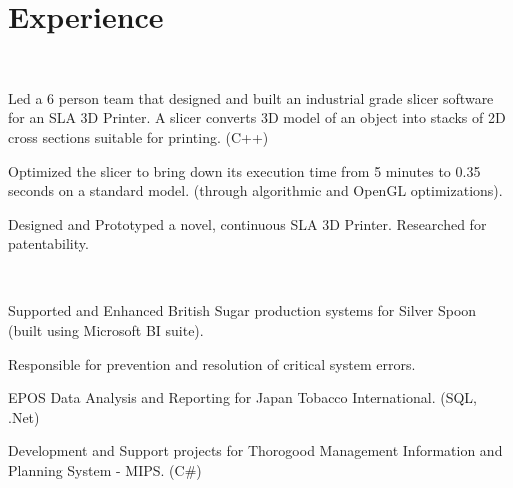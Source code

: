 \documentclass[]{deedy-resume-openfont}
\begin{document}
\begin{minipage}[t]{0.66\textwidth} 



\section{Experience}

\\
\vspace{13pt}
\begin{tightemize}
\item  Led a 6 person team that designed and built an industrial grade slicer software for an SLA 3D Printer. A slicer converts 3D model of an object into stacks of 2D cross sections suitable for printing. (C++)
\item Optimized the slicer to bring down its execution time from 5 minutes to 0.35 seconds on a standard model. (through algorithmic and OpenGL optimizations).
\item Designed and Prototyped a novel, continuous SLA 3D Printer. Researched for patentability.
\end{tightemize}

\sectionsep{}

\\
\vspace{\topsep} %
\begin{tightemize}
\item Supported and Enhanced British Sugar production systems for Silver Spoon (built using Microsoft BI suite).
	\item Responsible for prevention and resolution of critical system errors.  
	\item EPOS Data Analysis and Reporting for Japan Tobacco International. (SQL, .Net)
	\item Development and Support projects for Thorogood Management Information and Planning System - MIPS. (C\#)
\end{tightemize}
\sectionsep


\end{minipage}
\end{document}
